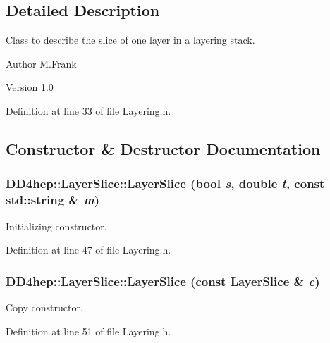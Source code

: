 \subsection{Detailed Description}
Class to describe the slice of one layer in a layering stack. \begin{DoxyAuthor}{Author}
M.Frank 
\end{DoxyAuthor}
\begin{DoxyVersion}{Version}
1.0 
\end{DoxyVersion}


Definition at line 33 of file Layering.h.

\subsection{Constructor \& Destructor Documentation}
\hypertarget{class_d_d4hep_1_1_layer_slice_ae70daa0af493afe9ff51032df8f1a5ca}{
\subsubsection[{LayerSlice}]{\setlength{\rightskip}{0pt plus 5cm}DD4hep::LayerSlice::LayerSlice (bool {\em s}, \/  double {\em t}, \/  const std::string \& {\em m})}}
\label{class_d_d4hep_1_1_layer_slice_ae70daa0af493afe9ff51032df8f1a5ca}


Initializing constructor. 

Definition at line 47 of file Layering.h.\hypertarget{class_d_d4hep_1_1_layer_slice_a9701e10d9e18e708c9f2664149e764fa}{
\subsubsection[{LayerSlice}]{\setlength{\rightskip}{0pt plus 5cm}DD4hep::LayerSlice::LayerSlice (const {\bf LayerSlice} \& {\em c})}}
\label{class_d_d4hep_1_1_layer_slice_a9701e10d9e18e708c9f2664149e764fa}


Copy constructor. 

Definition at line 51 of file Layering.h.

